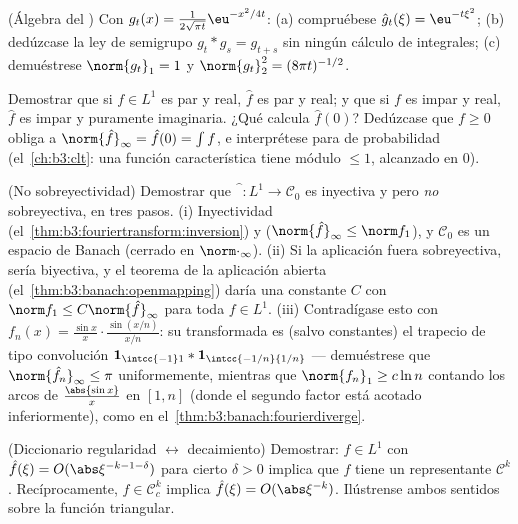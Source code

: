 \begin{exercise}[$\star\star$]\label{exo:b3:fouriertransform:4}
(Álgebra del ) Con
$g_t(x) =
\frac1{2\sqrt{\pi t}}\eu^{-x^2/4t}$: (a) compruébese
$\hat g_t(\xi) = \eu^{-t\xi^2}$; (b) dedúzcase la ley de semigrupo
$g_t * g_s = g_{t+s}$ sin ningún cálculo de integrales; (c) demuéstrese
$\norm{g_t}_1 = 1$ y $\norm{g_t}_2^2 =
(8\pi t)^{-1/2}$.
\end{exercise}

\begin{exercise}[$\star\star$]\label{exo:b3:fouriertransform:5}
Demostrar que si $f \in L^1$ es par y real, $\hat f$ es par y real; y
que si $f$ es impar y real, $\hat f$ es impar y puramente imaginaria.
¿Qué calcula $\hat f(0)$? Dedúzcase que $f \geq
0$ obliga a $\norm{\hat f}_\infty = \hat f(0) = \int f$, e interprétese
para  de probabilidad (el~\cref{ch:b3:clt}: una función
característica tiene módulo $\leq 1$, alcanzado en
$0$).
\end{exercise}

\begin{exercise}[$\star\star\star$]\label{exo:b3:fouriertransform:6}
(No sobreyectividad) Demostrar que $\widehat{\phantom f}\colon L^1
\to \mathcal C_0$ es inyectiva y
 pero \emph{no}
sobreyectiva, en tres pasos. (i) Inyectividad
(el~\cref{thm:b3:fouriertransform:inversion}) y
($\norm{\hat f}_\infty \leq \norm f_1$), y $\mathcal C_0$ es un espacio
de Banach (cerrado en
$\norm\cdot_\infty$).
(ii) Si la aplicación fuera sobreyectiva, sería biyectiva, y el teorema
de la aplicación abierta (el~\cref{thm:b3:banach:openmapping}) daría una
constante $C$ con $\norm f_1 \leq C\norm{\hat
f}_\infty$ para toda $f \in L^1$. (iii) Contradígase esto con
$f_n(x) = \frac{\sin
x}{x}\cdot\frac{\sin(x/n)}{x/n}$: su transformada es (salvo constantes)
el trapecio de tipo convolución $\mathbf 1_{\intcc{-1}1} *
\mathbf 1_{\intcc{-1/n}{1/n}}$ --- demuéstrese que
$\norm{\hat f_n}_\infty \leq \pi$ uniformemente, mientras que
$\norm{f_n}_1 \geq c\ln n$ contando los arcos de $\frac{\abs{\sin x}}x$
en $[1, n]$ (donde el segundo factor está acotado inferiormente), como
en el~\cref{thm:b3:banach:fourierdiverge}.
\end{exercise}

\begin{exercise}[$\star\star$]\label{exo:b3:fouriertransform:7}
(Diccionario regularidad $\leftrightarrow$ decaimiento) Demostrar:
$f \in
L^1$ con $\hat f(\xi) = O(\abs\xi^{-k-1-\delta})$ para cierto
$\delta > 0$ implica que $f$ tiene un representante $\mathcal C^k$.
Recíprocamente, $f \in \mathcal C^k_c$ implica $\hat f(\xi) =
O(\abs\xi^{-k})$. Ilústrense ambos sentidos sobre la función triangular.
\end{exercise}

